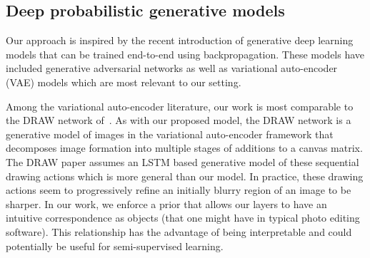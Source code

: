 \label{sec:related}
\vspace{-2mm}

\subsection{Deep probabilistic generative models}
\vspace{-2mm}
Our approach is inspired by the recent introduction of generative deep learning models that can be
trained end-to-end using backpropagation.  These models have included
generative adversarial networks \citep{denton2015deep, goodfellow2014generative}
as well as variational auto-encoder (VAE) models \citep{Kingma2014,kingma2014semi,rezende2014stochastic,burda2015importance}
which are most relevant to our setting.  

Among the variational auto-encoder literature, our work is most comparable to 
the DRAW network of~\cite{gregor2015draw}.  As with our proposed model, 
the DRAW network is a generative model of images in the variational auto-encoder framework
that decomposes image formation into multiple stages of additions to a canvas matrix.  The DRAW paper assumes an LSTM based generative model of these sequential 
drawing actions which is more general than our model.
In practice, these drawing actions seem to progressively refine an initially blurry region of an image to  be sharper.
In our work, we enforce a prior that allows our layers to have an intuitive correspondence
as objects (that one might have in typical photo editing software).  This relationship has the advantage of being interpretable
and could potentially be useful for semi-supervised learning.


\vspace{-2mm}
